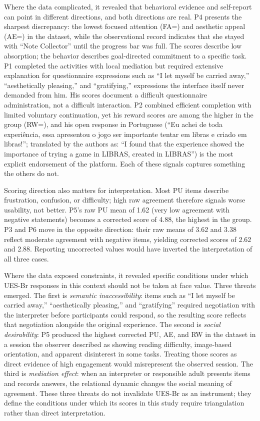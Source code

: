 \documentclass{llncs}
\begin{document}
Where the data complicated, it revealed that behavioral evidence and self-report can
point in different directions, and both directions are real. P4 presents the
sharpest discrepancy: the lowest focused attention (FA\thinspace=) and
aesthetic appeal (AE\thinspace=) in the dataset, while the observational
record indicates that she stayed with ``Note Collector'' until the progress bar was full. The
scores describe low absorption; the behavior describes goal-directed commitment to a
specific task. P1 completed the activities with local mediation but required extensive
explanation for questionnaire expressions such as ``I let myself be carried away,''
``aesthetically pleasing,'' and ``gratifying,'' expressions the interface itself never demanded from him. His scores document a difficult questionnaire administration, not a
difficult interaction. P2 combined efficient completion with limited voluntary
continuation, yet his reward scores are among the higher in the group (RW\thinspace=), and his open response in Portuguese (``Eu achei de toda experi\^encia, essa apresentou o jogo ser importante tentar em libras e criado em libras!''; translated by the authors as: ``I found that the experience showed the importance of trying a game in LIBRAS, created in LIBRAS'') is the most explicit endorsement of the platform. Each of these signals
captures something the others do not.

Scoring direction also matters for interpretation. Most PU items describe frustration, confusion, or difficulty; high raw agreement therefore signals worse usability, not better. P5's raw PU mean of 1.62 (very low agreement with negative statements) becomes a corrected score of 4.88, the highest in the group. P3 and P6 move in the opposite direction: their raw means of 3.62 and 3.38 reflect moderate agreement with negative items, yielding corrected scores of 2.62 and 2.88. Reporting uncorrected values would have inverted the interpretation of all three cases.

Where the data exposed constraints, it revealed specific conditions under which UES-Br
responses in this context should not be taken at face value. Three threats emerged. The
first is \textit{semantic inaccessibility}: items such as ``I let myself be carried away,'' ``aesthetically pleasing,'' and ``gratifying'' required negotiation with the interpreter before participants could respond, so the resulting score reflects that negotiation alongside the original
experience. The second is \textit{social desirability}: P5 produced the highest
corrected PU, AE, and RW in the dataset in a session the observer described as showing
reading difficulty, image-based orientation, and apparent disinterest in some tasks.
Treating those scores as direct evidence of high engagement would misrepresent
the observed session. The third is \textit{mediation effect}: when an interpreter or
responsible adult presents items and records answers, the relational dynamic changes
the social meaning of agreement. These three threats do not invalidate UES-Br as an
instrument; they define the conditions under which its scores in this study require
triangulation rather than direct interpretation.
\end{document}
